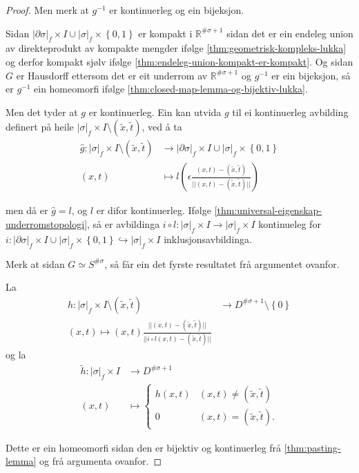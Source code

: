 \documentclass[a4paper, 12pt, norsk]{article}
\theoremstyle{plain}
\theoremstyle{definition}
\newcommand{\Rb}{\mathbb{R}}
\newcommand{\union}{ \mathop{\cup}\limits }
\newcommand{\gr}[1]{ \lvert #1 \rvert } %
\newcommand{\set}[1]{ \left\{ #1 \right\} } %
\newcommand{\tuple}[1]{ \left( #1 \right) } %
\begin{document}
\begin{proof}
	Men merk at  \( g^{-1} \) er kontinuerleg og ein bijeksjon.
	
	Sidan \( \gr{\partial\sigma}_f \times I \union \gr{\sigma}_f \times \set{0, 1} \) er kompakt i \( \Rb^{\#\sigma+1} \) sidan det er ein endeleg union av direkteprodukt av kompakte mengder ifølge \autoref{thm:geometrisk-kompleks-lukka} og derfor kompakt sjølv ifølge \autoref{thm:endeleg-union-kompakt-er-kompakt}. Og sidan \( G \) er Hausdorff ettersom det er eit underrom av \( \Rb^{\#\sigma+1} \) og \( g^{-1} \) er ein bijeksjon, så er \( g^{-1} \) ein homeomorfi ifølge \autoref{thm:closed-map-lemma-og-bijektiv-lukka}.
	
	Men det tyder at \( g \) er kontinuerleg. Ein kan utvida \( g \) til ei kontinuerleg avbilding definert på heile \( \gr{\sigma}_f \times I \setminus \tuple{\tilde{x}, \tilde{t}} \), ved å ta
	\begin{align*}
		\hat{g} : \gr{\sigma}_f \times I \setminus \tuple{\tilde{x}, \tilde{t}} &\to \gr{\partial\sigma}_f \times I \union \gr{\sigma}_f \times \set{0, 1} \\
		(x,t) &\mapsto l\tuple{\epsilon\frac{(x,t)-\tuple{\tilde{x}, \tilde{t}}}{||(x,t) - \tuple{\tilde{x}, \tilde{t}}||}}
	\end{align*}

	men då er \( \hat{g} = l \), og \( l \) er difor kontinuerleg. Ifølge \autoref{thm:universal-eigenskap-underromstopologi}, så er avbildinga \( i \circ l : \gr{\sigma}_f \times I \to \gr{\sigma}_f \times I \) kontinueleg for \( i: \gr{\partial\sigma}_f \times I \union \gr{\sigma}_f \times \set{0, 1} \hookrightarrow \gr{\sigma}_f \times I \) inklusjonsavbildinga.
	
	Merk at sidan \( G \simeq S^{\#\sigma} \), så får ein det fyrste resultatet frå argumentet ovanfor.

	La
	\begin{align*}
		h: \gr{\sigma}_f \times I \setminus \tuple{\tilde{x}, \tilde{t}} &\to D^{\#\sigma+1} \setminus \set{0} \\
		(x, t) \mapsto \tuple{x, t}\frac{||(x,t) - (\tilde{x}, \tilde{t})||}{||i\circ l(x,t)-(\tilde{x}, \tilde{t})||}
	\end{align*}
	og la
	\begin{align*}
		\tilde{h}: \gr{\sigma}_f \times I &\to D^{\#\sigma+1} \\
		(x,t) &\mapsto
		\begin{cases}
			h(x,t) & (x, t) \neq (\tilde{x}, \tilde{t}) \\
			0 & (x, t) = (\tilde{x}, \tilde{t}).
		\end{cases}
	\end{align*}

	Dette er ein homeomorfi sidan den er bijektiv og kontinuerleg frå \autoref{thm:pasting-lemma} og frå argumenta ovanfor.
\end{proof}
\end{document}
